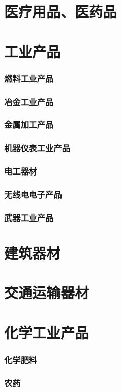 \documentclass[UTF8]{../../RepresentationUniverse}
\begin{document}
\section{医疗用品、医药品}
\section{工业产品}
    \subsubsection{燃料工业产品}
    \subsubsection{冶金工业产品}
    \subsubsection{金属加工产品}
    \subsubsection{机器仪表工业产品}
    \subsubsection{电工器材}
    \subsubsection{无线电电子产品}
    \subsubsection{武器工业产品}
\section{建筑器材}
\section{交通运输器材}
\section{化学工业产品}
    \subsubsection{化学肥料}
    \subsubsection{农药}
\end{document}
